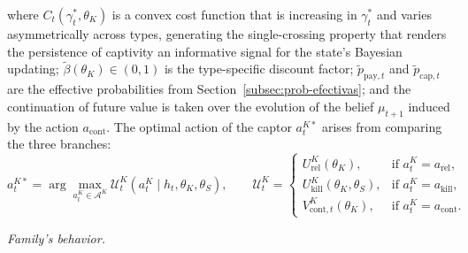\documentclass[ecta,nameyear,draft]{econsocart}
\theoremstyle{plain}
\theoremstyle{definition}
\newcommand{\1}{\mathbf{1}}
\begin{document}
where $C_t(\gamma_t^\ast,\theta_K)$ is a convex cost function that is increasing in $\gamma_t^\ast$ and varies asymmetrically across types, generating the single-crossing property that renders the persistence of captivity an informative signal for the state's Bayesian updating; $\tilde{\beta}(\theta_K)\in(0,1)$ is the type-specific discount factor; $\tilde{p}_{\mathrm{pay},t}$ and $\tilde{p}_{\mathrm{cap},t}$ are the effective probabilities from Section~\ref{subsec:prob-efectivas}; and the continuation of future value is taken over the evolution of the belief $\mu_{t+1}$ induced by the action $a_{\mathrm{cont}}$. The optimal action of the captor $a_t^{K\ast}$ arises from comparing the three branches:
\begin{equation}
a_t^{K\ast}=\arg\max_{a_t^K\in\mathcal{A}^K}\mathcal{U}^K_t(a_t^K\mid h_t,\theta_K,\theta_S),\qquad
\mathcal{U}^K_t=\begin{cases}U^K_{\mathrm{rel}}(\theta_K), & \text{if }a_t^K=a_{\mathrm{rel}},\\U^K_{\mathrm{kill}}(\theta_K,\theta_S), & \text{if }a_t^K=a_{\mathrm{kill}},\\V^K_{\mathrm{cont},t}(\theta_K), & \text{if }a_t^K=a_{\mathrm{cont}}.\end{cases}
\label{eq:k-argmax}
\end{equation}

\noindent\textit{Family's behavior.}
\end{document}
